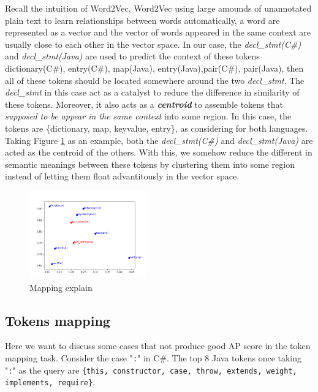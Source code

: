 Recall the intuition of Word2Vec, Word2Vec using large amounds of unannotated plain text to learn relationships between words automatically, a word are represented as a vector  and the vector of words appeared in the same context are usually close to each other in the vector space. In our case, the \textit{decl\_stmt(C\#)} and \textit{decl\_stmt(Java)} are used to predict the context of these tokens {dictionary(C\#), entry(C\#), map(Java), entry(Java),pair(C\#), pair(Java)}, then all of these tokens should be located somewhere around the two \textit{decl\_stmt}. The \textit{decl\_stmt} in this case act as a catalyst to reduce the difference in similarity of these tokens. Moreover, it also acts as a \textit{\textbf{centroid}} to assemble tokens that \textit{supposed to be appear in the same context} into some region. In this case, the tokens are \{dictionary, map, keyvalue, entry\}, as considering for both languages. Taking Figure \ref{fig:mapping_explain} as an example, both the \textit{decl\_stmt(C\#)} and \textit{decl\_stmt(Java)} are acted as the centroid of the others. With this, we somehow reduce the different in semantic meanings between these tokens by clustering them into some region instead of letting them float advantitously in the vector space.


\begin{figure}[t!]
	\includegraphics[width=0.45\textwidth]{mapping_explain}
	
	\caption{Mapping explain}
	\label{fig:mapping_explain}
	\medskip
\end{figure}

\subsection{Tokens mapping}
Here we want to discuss some cases that not produce good AP score in the token mapping task. Consider the case "\texttt{:}" in C\#. The top 8 Java tokens once taking "\texttt{:}" as the query are \texttt{\{this, constructor, case, throw, extends, weight, implements, require\}}. 

